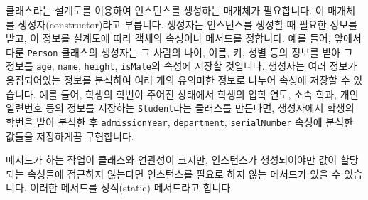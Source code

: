 클래스라는 설계도를 이용하여 인스턴스를 생성하는 매개체가 필요합니다. 이 매개체를 생성자(constructor)라고 부릅니다. 생성자는 인스턴스를 생성할 때 필요한 정보를 받고, 이 정보를 설계도에 따라 객체의 속성이나 메서드를 정합니다. 예를 들어, 앞에서 다룬 \verb|Person| 클래스의 생성자는 그 사람의 나이, 이름, 키, 성별 등의 정보를 받아 그 정보를 \verb|age|, \verb|name|, \verb|height|, \verb|isMale|의 속성에 저장할 것입니다. 생성자는 여러 정보가 응집되어있는 정보를 분석하여 여러 개의 유의미한 정보로 나누어 속성에 저장할 수 있습니다. 예를 들어, 학생의 학번이 주어진 상태에서 학생의 입학 연도, 소속 학과, 개인 일련번호 등의 정보를 저장하는 \verb|Student|라는 클래스를 만든다면, 생성자에서 학생의 학번을 받아 분석한 후 \verb|admissionYear|, \verb|department|, \verb|serialNumber| 속성에 분석한 값들을 저장하게끔 구현합니다. 

메서드가 하는 작업이 클래스와 연관성이 크지만, 인스턴스가 생성되어야만 값이 할당되는 속성들에 접근하지 않는다면 인스턴스를 필요로 하지 않는 메서드가 있을 수 있습니다. 이러한 메서드를 정적(static) 메서드라고 합니다. 
